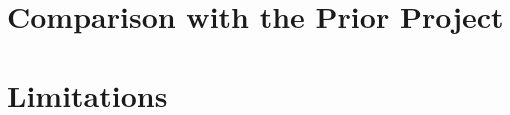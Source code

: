 


\section{Comparison with the Prior Project}
\label{sec:comparison-prior}


\section{Limitations}
\label{sec:limitations}

